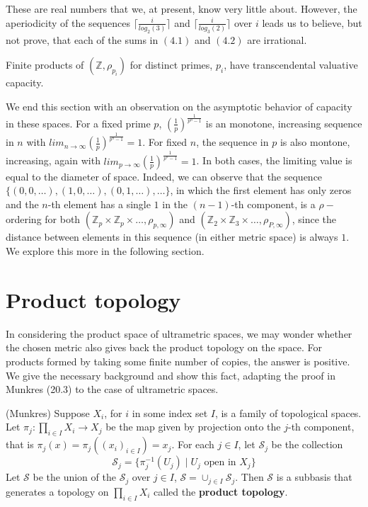 These are real numbers that we, at present, know very little about. However, the aperiodicity of the sequences $\lceil\frac{i}{log_2(3)}\rceil$ and $\lceil\frac{i}{log_3(2)}\rceil$ over $i$ leads us to believe, but not prove, that each of the sums in $(4.1)$ and $(4.2)$ are irrational.

\begin{conjecture} Finite products of $(\mathbb{Z}, \rho_{p_i})$ for distinct primes, $p_i$, have transcendental valuative capacity. \end{conjecture}
 
We end this section with an observation on the asymptotic behavior of capacity in these spaces. For a fixed prime $p$,  $(\frac{1}{p})^{\frac{1}{p^n-1}}$ is an monotone, increasing sequence in $n$ with $ lim_{n\to\infty} (\frac{1}{p})^{\frac{1}{p^n-1}} =  1$. For fixed $n$, the sequence in $p$ is also montone, increasing, again with  $ lim_{p\to\infty} (\frac{1}{p})^{\frac{1}{p^n-1}}=1$. In both cases, the limiting value is equal to the diameter of space. Indeed, we can observe that the sequence $\{(0,0,\ldots), (1,0,\ldots), (0,1,\ldots), \ldots\}$, in which the first element has only zeros and the $n$-th element has a single $1$ in the $(n-1)$-th component, is a $\rho-$ordering for both  $(\mathbb{Z}_p \times \mathbb{Z}_p \times \ldots, \rho_{p,\infty})$  and  $(\mathbb{Z}_2 \times \mathbb{Z}_3 \times \ldots, \rho_{P,\infty})$, since the distance between elements in this sequence (in either metric space) is always $1$. We explore this more in the following section.\\

\section*{Product topology}
In considering the product space of ultrametric spaces, we may wonder whether the chosen metric also gives back the product topology on the space.  For products formed by taking some finite number of copies, the answer is positive. We give the necessary background and show this fact, adapting the proof in Munkres (20.3) to the case of ultrametric spaces. 

\begin{definition-proposition} (Munkres)
Suppose $X_i$, for $i$ in some index set $I$, is a family of topological spaces.  Let $\pi_j: \prod_{i \in I} X_i \rightarrow X_j$ be the map given by projection onto the $j$-th component, that is $\pi_j (x) = \pi_j ((x_i)_{i \in I}) = x_j$. For each $j \in I$, let $\mathcal{S}_j$ be the collection \[\mathcal{S}_j = \{\pi^{-1}_j (U_j)\mid U_j \text{ open in } X_j\}\] Let $\mathcal{S}$ be the union of the $\mathcal{S}_j$ over $j \in I$, $\mathcal{S}= \cup_{j \in I} \mathcal{S}_j$. Then $\mathcal{S}$ is a subbasis that generates a topology on  $\prod_{i \in I} X_i$ called the \textbf{product topology}.\\

\end{definition-proposition}


